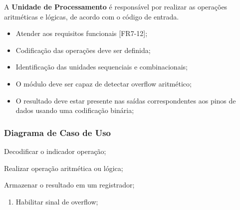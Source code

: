   A \textbf{Unidade de Processamento} é responsável por realizar as operações aritméticas e lógicas, de acordo com o código de entrada.
  
  \actors
    \begin{description}
    \end{description}
  
  \preconditions 
    \begin{itemize}
     \item Atender aos requisitos funcionais [FR7-12];
     \item Codificação das operações deve ser definida;
     \item Identificação das unidades sequenciais e combinacionais;
    \end{itemize}

  \postconditions
    \begin{itemize}
     \item O módulo deve ser capaz de detectar overflow aritmético;
     \item O resultado deve estar presente nas saídas correspondentes aos pinos de dados usando uma codificação binária;
    \end{itemize}
  
  \subsubsection*{Diagrama de Caso de Uso}
    \begin{landscape}
  	
 	\end{landscape}
 
  
  \begin{mainflow}
    \item Decodificar o indicador operação;
    \item Realizar operação aritmética ou lógica;
    \item Armazenar o resultado em um registrador;
  \end{mainflow}
  
  \begin{secondaryflow} 
    \begin{enumerate}
      \item Habilitar sinal de overflow;
    \end{enumerate}
  \end{secondaryflow} 